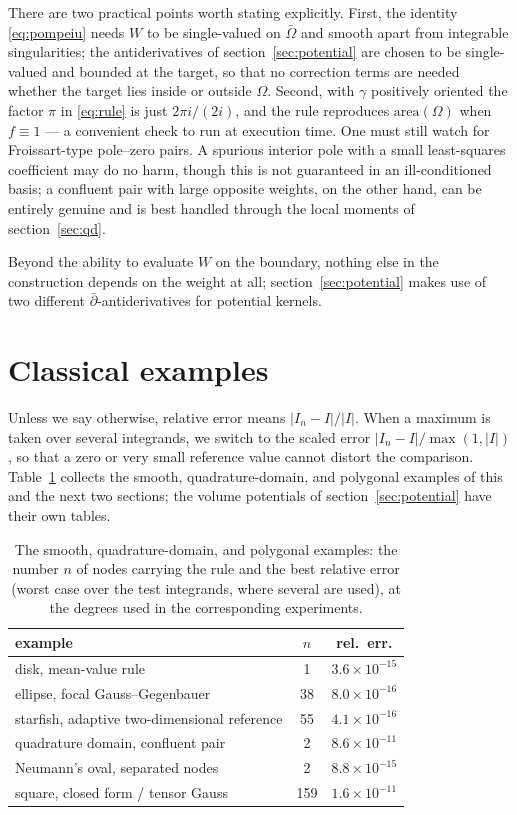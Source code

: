 \documentclass[onefignum,onetabnum]{siamart220329}
\begin{document}
There are two practical points worth stating explicitly. First, the identity
\eqref{eq:pompeiu} needs $W$ to be single-valued on $\bar\Omega$ and
smooth apart from integrable singularities; the antiderivatives of
section~\ref{sec:potential} are chosen to be single-valued and bounded
at the target, so that no correction terms are needed whether the
target lies inside or outside $\Omega$. Second, with $\gamma$
positively oriented the factor $\pi$ in \eqref{eq:rule} is just
$2\pi i/(2i)$, and the rule reproduces $\mathrm{area}(\Omega)$ when
$f \equiv 1$ --- a convenient check to run at execution time. One must
still watch for Froissart-type pole--zero pairs. A spurious interior
pole with a small least-squares coefficient may do no harm, though this
is not guaranteed in an ill-conditioned basis; a confluent pair with
large opposite weights, on the other hand, can be entirely genuine and
is best handled through the local moments of section~\ref{sec:qd}.

Beyond the ability to evaluate $W$ on the boundary, nothing else in the
construction depends on the weight at all; section~\ref{sec:potential}
makes use of two different $\bar\partial$-antiderivatives for potential
kernels.

\section{Classical examples}
\label{sec:classical}

Unless we say otherwise, relative error means $|I_n-I|/|I|$. When a
maximum is taken over several integrands, we switch to the scaled error
$|I_n-I|/\max(1,|I|)$, so that a zero or very small reference value
cannot distort the comparison. Table~\ref{tab:summary} collects the
smooth, quadrature-domain, and polygonal examples of this and the next
two sections; the volume potentials of
section~\ref{sec:potential} have their own tables.

\begin{table}[t]
\centering
\caption{The smooth, quadrature-domain, and polygonal examples: the
number $n$ of nodes carrying the rule and the best relative error
(worst case over the test integrands, where several are used), at the
degrees used in the corresponding experiments.}
\label{tab:summary}
\begin{tabular}{lcc}
\toprule
example & $n$ & rel.\ err.\\
\midrule
disk, mean-value rule                     & 1   & $3.6\times10^{-15}$\\
ellipse, focal Gauss--Gegenbauer          & 38  & $8.0\times10^{-16}$\\
starfish, adaptive two-dimensional reference & 55  & $4.1\times10^{-16}$\\
quadrature domain, confluent pair         & 2   & $8.6\times10^{-11}$\\
Neumann's oval, separated nodes           & 2   & $8.8\times10^{-15}$\\
square, closed form / tensor Gauss        & 159 & $1.6\times10^{-11}$\\
\bottomrule
\end{tabular}
\end{table}
\end{document}
